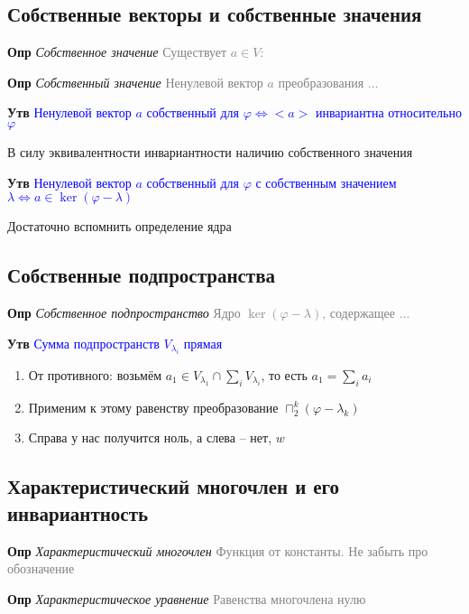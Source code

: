 \subsection{Собственные векторы и собственные значения}

\textbf{Опр} \textit{Собственное значение} \textcolor{gray}{Существует $a \in V:$}

\textbf{Опр} \textit{Собственный значение} \textcolor{gray}{Ненулевой вектор $a$ преобразования ...}

\textbf{Утв} \textcolor{blue}{Ненулевой вектор $a$ собственный для $\varphi \Leftrightarrow <a>$ инвариантна
относительно $\varphi$}

В силу эквивалентности инвариантности наличию собственного значения

\textbf{Утв} \textcolor{blue}{Ненулевой вектор $a$ собственный для $\varphi$ с собственным
значением $\lambda \Leftrightarrow a \in \ker (\varphi - \lambda)$}

Достаточно вспомнить определение ядра

\subsection{Собственные подпространства}

\textbf{Опр} \textit{Собственное подпространство} \textcolor{gray}{Ядро $\ker (\varphi - \lambda)$, содержащее ...}

\textbf{Утв} \textcolor{blue}{Сумма подпространств $V_{\lambda_i}$ прямая}

\begin{enumerate}
    \item От противного: возьмём $a_1 \in V_{\lambda_1} \cap \sum_i V_{\lambda_i}$, то есть $a_1 = \sum_i a_i$
    \item Применим к этому равенству преобразование $\sqcap_2^k (\varphi - \lambda_k)$
    \item Справа у нас получится ноль, а слева -- нет, $w$
\end{enumerate}

\subsection{Характеристический многочлен и его инвариантность}

\textbf{Опр} \textit{Характеристический многочлен} \textcolor{gray}{Функция от константы. Не забыть про обозначение}

\textbf{Опр} \textit{Характеристическое уравнение} \textcolor{gray}{Равенства многочлена нулю}

